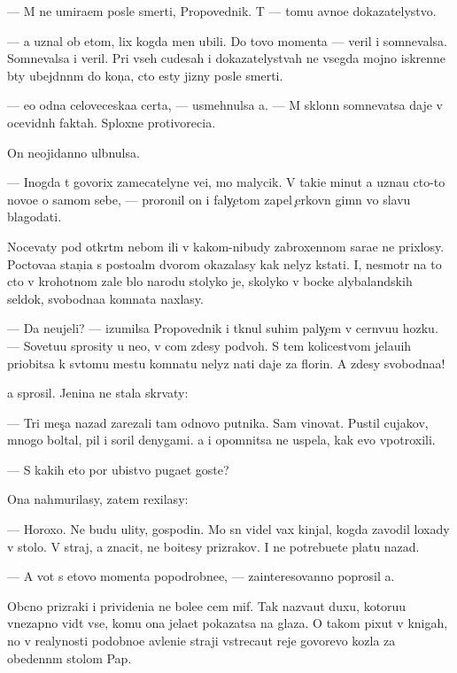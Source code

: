 \documentclass[10pt]{book}
\begin{document}
— M{\yi} ne umira{\y}em posle smerti, Propovednik. T{\yi} — tomu {\y}avno{\y}e dokazatelystvo.

— {\Y}a uznal ob etom, lix kogda men{\ia} ubili. Do tovo momenta — veril i somnevalsa. Somnevalsa i veril. Pri vseh cudesah i dokazatelystvah ne vsegda mojno iskrenne b{\yi}ty ubejd{\e}nn{\yi}m do kon{\c}a, cto {\y}esty jizny posle smerti.

— {\Y}e{\x}o odna celoveceska{\y}a certa, — usmehnulsa {\y}a. — M{\yi} sklonn{\yi} somnevatsa daje v ocevidn{\yi}h faktah. Sploxn{\yi}{\y}e protivoreci{\y}a.

On neojidanno ul{\yi}bnulsa.

— Inogda t{\yi} govorix zamecatelyn{\yi}{\y}e ve{\x}i, mo{\y} malycik. V taki{\y}e minut{\yi} {\y}a uzna{\y}u cto-to novo{\y}e o samom sebe, — proronil on i faly{\c}etom zapel {\c}erkovn{\yi}{\y} gimn vo slavu blagodati.



Nocevaty pod otkr{\yi}t{\yi}m nebom ili v kakom-nibudy zabroxennom sara{\y}e ne prixlosy. Poctova{\y}a stan{\c}i{\y}a s posto{\y}al{\yi}m dvorom okazalasy kak nelyz{\ia} kstati. I, nesmotr{\ia} na to cto v krohotnom zale b{\yi}lo narodu stolyko je, skolyko v bocke alybalandskih sel{\e}dok, svobodna{\y}a komnata naxlasy.

— Da neujeli? — izumilsa Propovednik i tknul suhim paly{\c}em v cern{\ia}vu{\y}u hoz{\ia}{\y}ku. — Sovetu{\y}u sprosity u ne{\y}o, v com zdesy podvoh. S tem kolicestvom jela{\y}u{\x}ih priob{\x}itsa k sv{\ia}tomu mestu komnatu nelyz{\ia} na{\y}ti daje za florin. A zdesy svobodna{\y}a!

{\Y}a sprosil. Jen{\x}ina ne stala skr{\yi}vaty:

— Tri mes{\ia}{\c}a nazad zarezali tam odnovo putnika. Sam vinovat. Pustil cujakov, mnogo boltal, pil i soril denygami. {\Y}a i opomnitsa ne uspela, kak {\y}evo v{\yi}potroxili.

— S kakih eto por ubi{\y}stvo puga{\y}et goste{\y}?

Ona nahmurilasy, zatem rexilasy:

— Horoxo. Ne budu {\y}ulity, gospodin. Mo{\y} s{\yi}n videl vax kinjal, kogda zavodil loxady v sto{\y}lo. V{\yi} straj, a znacit, ne bo{\y}itesy prizrakov. I ne potrebu{\y}ete platu nazad.

— A vot s etovo momenta popodrobne{\y}e, — zainteresovanno poprosil {\y}a.

Ob{\yi}cno prizraki i privideni{\y}a ne bole{\y}e cem mif. Tak naz{\yi}va{\y}ut duxu, kotoru{\y}u vnezapno vid{\ia}t vse, komu ona jela{\y}et pokazatsa na glaza. O takom pixut v knigah, no v realynosti podobno{\y}e {\y}avleni{\y}e straji vstreca{\y}ut reje govor{\ia}{\x}evo kozla za obedenn{\yi}m stolom Pap{\yi}.
\end{document}
